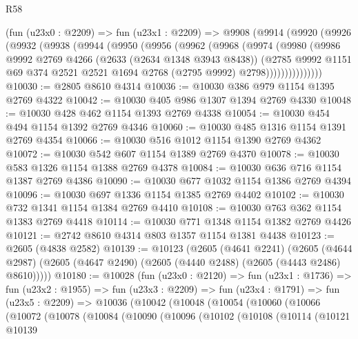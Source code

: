 \begin{lexlean}{R58}
\begin{coremodule}
    (fun (u23x0 : @2209) =>
    fun (u23x1 : @2209) =>
    @9908
      (@9914
        (@9920
          (@9926
            (@9932
              (@9938
                (@9944
                  (@9950
                    (@9956
                      (@9962
                        (@9968
                          (@9974
                            (@9980
                              (@9986
                                @9992
                                @2769
                                @4266
                                (@2633 (@2634 @1348 @3943 @8438))
                                (@2785
                                  @9992
                                  @1151
                                  @69
                                  @374
                                  @2521
                                  @2521
                                  @1694
                                  @2768
                                  (@2795 @9992)
                                  @2798)))))))))))))))
@10030 := @2805 @8610 @4314
@10036 := @10030 @386 @979 @1154 @1395 @2769 @4322
@10042 := @10030 @405 @986 @1307 @1394 @2769 @4330
@10048 := @10030 @428 @462 @1154 @1393 @2769 @4338
@10054 := @10030 @454 @494 @1154 @1392 @2769 @4346
@10060 := @10030 @485 @1316 @1154 @1391 @2769 @4354
@10066 := @10030 @516 @1012 @1154 @1390 @2769 @4362
@10072 := @10030 @542 @607 @1154 @1389 @2769 @4370
@10078 := @10030 @583 @1326 @1154 @1388 @2769 @4378
@10084 := @10030 @636 @716 @1154 @1387 @2769 @4386
@10090 := @10030 @677 @1032 @1154 @1386 @2769 @4394
@10096 := @10030 @697 @1336 @1154 @1385 @2769 @4402
@10102 := @10030 @732 @1341 @1154 @1384 @2769 @4410
@10108 := @10030 @763 @362 @1154 @1383 @2769 @4418
@10114 := @10030 @771 @1348 @1154 @1382 @2769 @4426
@10121 := @2742 @8610 @4314 @803 @1357 @1154 @1381 @4438
@10123 := @2605 (@4838 @2582)
@10139 := @10123
    (@2605
      (@4641 @2241)
      (@2605 (@4644 @2987) (@2605 (@4647 @2490) (@2605 (@4440 @2488) (@2605 (@4443 @2486) @8610)))))
@10180 := @10028
    (fun (u23x0 : @2120) =>
    fun (u23x1 : @1736) =>
    fun (u23x2 : @1955) =>
    fun (u23x3 : @2209) =>
    fun (u23x4 : @1791) =>
    fun (u23x5 : @2209) =>
    @10036
      (@10042
        (@10048
          (@10054
            (@10060
              (@10066
                (@10072
                  (@10078
                    (@10084
                      (@10090
                        (@10096
                          (@10102
                            (@10108
                              (@10114
                                (@10121
                                  @10139

\end{coremodule}
\end{lexlean}
